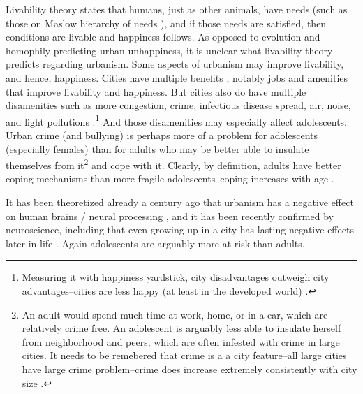 \documentclass[10pt, letterpaper]{article}
\begin{document}
\begin{spacing}{1.4}
Livability theory \citep{veenhoven95,veenhoven14b,veenhoven00b} states that
humans, just as other animals, have needs (such as those on Maslow hierarchy of
needs \citep{maslow87}), and if those needs are satisfied, then conditions are
livable and happiness follows. As opposed to evolution and homophily
predicting urban unhappiness, it is unclear what livability theory
 predicts regarding urbanism. Some aspects of urbanism may
 improve livability, and hence, happiness.
 Cities have multiple benefits  \citep{meyer13,florida08,glaeser11,osullivan09}, notably jobs and amenities that improve livability and
 happiness. But cities also do have multiple disamenities such as more congestion, crime,
   infectious  disease spread, air, noise, and light pollutions
   \citep{bettencourt10b,bettencourt07,meyer13,aokCityBook15}.\footnote{Measuring
     it with happiness yardstick,  city disadvantages outweigh city
     advantages--cities are less happy (at least in the developed world)
     \citep{aok21}.} 
   And those disamenities may especially affect adolescents. Urban
 crime (and bullying) is perhaps more of a problem for adolescents (especially
 females) than for adults who may be better able to insulate themselves from
 it\footnote{An adult would spend much time at work, home, or in a
   car, which are relatively crime free. An adolescent is arguably less able to
   insulate herself from neighborhood and peers, which are often infested with
   crime in large cities. It needs to be remebered that crime is a a city
   feature--all large cities have large crime problem--crime  does increase
   extremely consistently with city size \cite{blissCL_nov4_14,bettencourt13,bettencourt10,bettencourt10b,bettencourt07}.}
 and cope with it. Clearly, by definition, adults have better coping mechanisms
 than more fragile adolescents--coping increases with age \citep{leipold2019coping}. 

 It has been theoretized already a century ago that urbanism has a negative
 effect on human brains / neural processing \citep{simmel03}, and it has been
 recently confirmed by neuroscience, including that even growing up in a city has
 lasting negative effects later in life \citep{lederbogen11}. Again adolescents
 are arguably more at risk than adults. 
   

\end{spacing}
\end{document}
